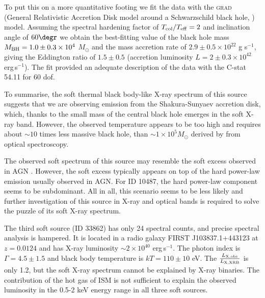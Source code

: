 \documentclass[fleqn,usenatbib]{mnras}
\newcommand{\ergps}{erg\,s$^{-1}$}
\newcommand{\msun}{M_\odot}
\newcommand{\lxlxrbrat}{\frac{L_{\rm X, obs}}{L_{\rm X, XRB}}}
\begin{document}
To put this on a more quantitative footing we fit the data with the \textsc{grad} (General Relativistic Accretion Disk model around a Schwarzschild black hole, \citealt{Ebisawa1991}) model. Assuming the spectral hardening factor of $T_{\rm col}/T_{\rm eff}=2$ and inclination angle of $60\degr$ we obtain the best-fitting value of the black hole mass $M_{\rm BH}=1.0\pm0.3\times10^4$ $M_\odot$ and the mass accretion rate of $2.9\pm0.5\times10^{22}$ g s$^{-1}$,  giving the Eddington ratio of $1.5\pm0.5$ (accretion luminosity $L=2\pm0.3\times10^{42}$ \ergps). The fit provided an adequate description of the data with the C-stat 54.11 for 60 dof. 




To summarise, the soft thermal black body-like X-ray spectrum of this source suggests that we are observing  emission from the Shakura-Sunyaev accretion disk, which, thanks to the small mass of the central black hole emerges in the soft X-ray band. However,  the observed temperature appears to be too high and requires about $\sim 10$ times less massive black hole, than 
$\sim1\times10^5 \msun$  derived by \citet{Chilingarian2018} from optical spectroscopy. 

The observed soft spectrum of this source may resemble the soft excess  observed in AGN \citep{Gierlinski2004, Done2010, Done2012}. However, the soft excess  typically appears on top of the  hard power-law emission usually observed in AGN. For ID 10487, the hard power-law component seems to be subdominant.
All in all,  this scenario seems to be less likely and further investigation of this source in X-ray and optical bands is required to solve the puzzle of its soft X-ray spectrum.
 


The third soft source (ID 33862) has only 24 spectral counts, and precise spectral analysis is hampered. It is located in a radio galaxy FIRST J103837.1+443123 at $z=0.0124$ and has X-ray luminosity $\sim2\times10^{40}$ \ergps. The photon index is $\Gamma=4.5\pm1.5$ and black body temperature is $kT=110\pm10$ eV. The $\lxlxrbrat$ is only 1.2, but the soft X-ray spectrum cannot be explained by X-ray binaries. The contribution of the hot gas of ISM is not sufficient to explain the observed luminosity in the 0.5-2 keV energy range in all three soft sources.
\end{document}
